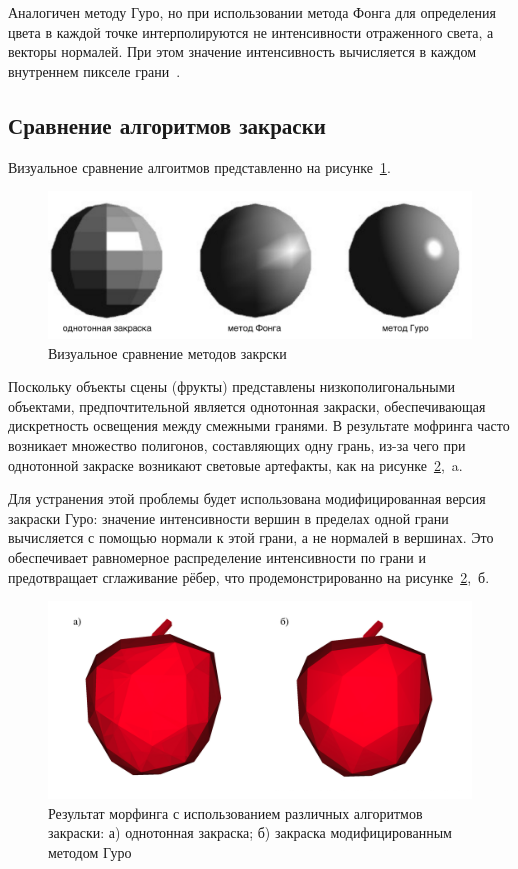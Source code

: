     Аналогичен методу Гуро, но при использовании метода Фонга для определения цвета в каждой точке интерполируются не интенсивности отраженного света, а векторы нормалей. При этом значение интенсивность вычисляется в каждом внутреннем пикселе грани~\cite{rogers,porev}.
    
    \subsection{Сравнение алгоритмов закраски}
    
    Визуальное сравнение алгоитмов представленно на рисунке~\ref{fig:shading_comparison}.
    
    \begin{figure}[H]
    	\centering
    	\includegraphics[width=1\textwidth]{../inc/images/shading_2}
    	\caption{Визуальное сравнение методов закрски}
	    \label{fig:shading_comparison}
    \end{figure}
    
    Поскольку объекты сцены (фрукты) представлены низкополигональными объектами, предпочтительной является однотонная закраски, обеспечивающая дискретность освещения между смежными гранями. В результате мофринга часто возникает множество полигонов, составляющих одну грань, из-за чего при однотонной закраске возникают световые артефакты, как на рисунке~\ref{fig:gouraund_midified},~a.
    
    Для устранения этой проблемы будет использована модифицированная версия закраски Гуро: значение интенсивности вершин в пределах одной грани вычисляется с помощью нормали к этой грани, а не нормалей в вершинах. Это обеспечивает равномерное распределение интенсивности по грани и предотвращает сглаживание рёбер, что продемонстрированно на рисунке~\ref{fig:gouraund_midified},~б.
    
    \begin{figure}[H]
	    \includegraphics[width=\linewidth]{../inc/images/gouraund_modified}
	    \caption{Результат морфинга с использованием различных алгоритмов закраски: а) однотонная закраска; б) закраска модифицированным методом Гуро}
 	    \label{fig:gouraund_midified}
    \end{figure}

